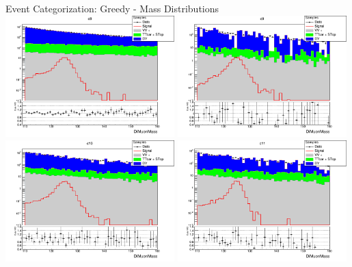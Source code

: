 \documentclass[pdf, 9pt]{beamer}
\begin{document}
  \begin{frame}{Event Categorization: Greedy - Mass Distributions}
    \includegraphics[width=0.49\textwidth, height=0.45\textheight]{figs/higgs/distributions/bdt_uf/distribution__c8__DiMuonMass__logY.png}
    \includegraphics[width=0.49\textwidth, height=0.45\textheight]{figs/higgs/distributions/bdt_uf/distribution__c9__DiMuonMass__logY.png}\\
    \includegraphics[width=0.49\textwidth, height=0.45\textheight]{figs/higgs/distributions/bdt_uf/distribution__c10__DiMuonMass__logY.png}
    \includegraphics[width=0.49\textwidth, height=0.45\textheight]{figs/higgs/distributions/bdt_uf/distribution__c11__DiMuonMass__logY.png}
  \end{frame}
\end{document}
